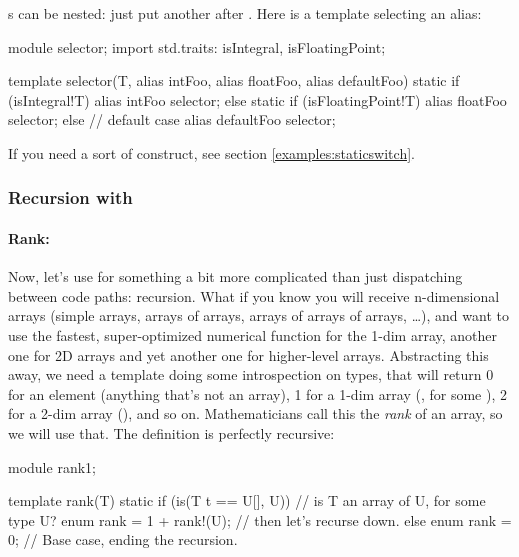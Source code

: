 s can be nested: just put another  after . Here is a template selecting an alias:

\begin{dcode}
module selector;
import std.traits: isIntegral, isFloatingPoint;

template selector(T, alias intFoo, alias floatFoo, alias defaultFoo)
{
    static if (isIntegral!T)
       alias intFoo selector;
    else static if (isFloatingPoint!T)
       alias floatFoo selector; 
    else // default case
        alias defaultFoo selector;
}
\end{dcode}

If you need a sort of  construct, see section \ref{examples:staticswitch}.

\subsubsection{\texorpdfstring{Recursion with }
                              {Recursion with static if}}
\label{staticifrecursion}

\paragraph{Rank:}\label{rank}

Now, let's use  for something a bit more complicated than just dispatching between code paths: recursion.  What if you know you will receive n-dimensional arrays (simple arrays, arrays of arrays, arrays of arrays of arrays, \ldots), and want to use the fastest, super-optimized numerical function for the 1-dim array, another one for 2D arrays and yet another one for higher-level arrays. Abstracting this away, we need a template doing some introspection on types, that will return 0 for an element (anything that's not an array), 1 for a 1-dim array (, for some ), 2 for a 2-dim array (), and so on. Mathematicians call this the \emph{rank} of an array, so we will use that. The definition is perfectly recursive: 
\begin{ndcode}
module rank1;

template rank(T)
{
    static if (is(T t == U[], U)) // is T an array of U, for some type U?
        enum rank = 1 + rank!(U); // then let's recurse down.
    else                          
        enum rank = 0;            // Base case, ending the recursion.
}
\end{ndcode}

